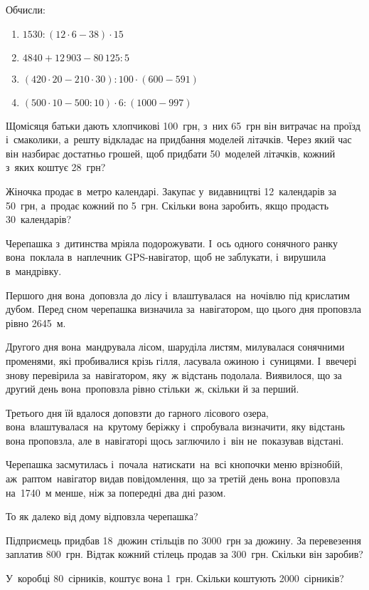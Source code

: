 \problem
Обчисли:
\begin{enumerate}
    \item $1530 : (12 \cdot 6 - 38) \cdot 15$
    \item $4840 + 12\,903 - 80\,125 : 5$
    \item $(420 \cdot 20 - 210 \cdot 30) : 100 \cdot (600 - 591)$
    \item $(500 \cdot 10 - 500 : 10) \cdot 6 : (1000 - 997)$
\end{enumerate}


\problem
Щомісяця батьки дають хлопчикові 100~грн, з~них 65~грн він витрачає
на проїзд і~смаколики, а~решту відкладає на придбання моделей літачків.
Через який час він назбирає достатньо грошей, щоб придбати 50~моделей літачків,
кожний з~яких коштує 28~грн?


\problem
Жіночка продає в~метро календарі.
Закупає у~видавництві 12~календарів за 50~грн, а~продає кожний по 5~грн.
Скільки вона заробить, якщо продасть 30~календарів?


\problem
Черепашка з~дитинства мріяла подорожувати. І~ось одного сонячного ранку
вона поклала в~наплечник GPS-навігатор, щоб не заблукати,
і~вирушила в~мандрівку.

Першого дня вона доповзла до лісу і~влаштувалася на ночівлю під крислатим
дубом. Перед сном черепашка визначила за навігатором, що цього дня
проповзла рівно 2645~м.

Другого дня вона мандрувала лісом, шаруділа листям, милувалася сонячними
променями, які пробивалися крізь гілля, ласувала ожиною і~суницями.
І~ввечері знову перевірила за навігатором, яку~ж відстань подолала.
Виявилося, що за другий день вона проповзла рівно стільки~ж,
скільки й за перший.

Третього дня їй вдалося доповзти до гарного лісового озера,
вона влаштувалася на крутому беріжку і~спробувала визначити,
яку відстань вона проповзла, але в~навігаторі щось заглючило
і~він не~показував відстані.

Черепашка засмутилась і~почала натискати на всі кнопочки меню врізнобій,
аж~раптом навігатор видав повідомлення, що за третій день вона проповзла
на 1740~м менше, ніж за попередні два дні разом.

То як далеко від дому відповзла черепашка?


\problem
Підприємець придбав 18~дюжин стільців по 3000~грн за дюжину.
За перевезення заплатив 800~грн.
Відтак кожний стілець продав за 300~грн.
Скільки він заробив?


\problem
У~коробці 80~сірників, коштує вона 1~грн.
Скільки коштують 2000~сірників?


